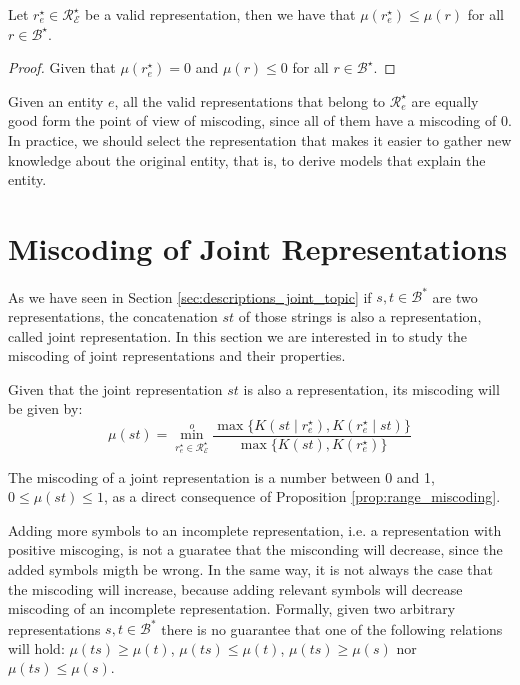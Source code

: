 \begin{proposition}
Let $r^\star_e \in \mathcal{R}^\star_\mathcal{E}$ be a valid representation, then we have that $\mu\left( r^\star_e \right) \leq \mu\left( r \right)$ for all $r \in \mathcal{B}^\star$.
\end{proposition}
\begin{proof}
Given that $\mu\left( r^\star_e \right) = 0$ and $\mu\left( r \right) \leq 0$ for all $r \in \mathcal{B}^\star$.
\end{proof}

Given an entity $e$, all the valid representations that belong to $\mathcal{R}^\star_e$ are equally good form the point of view of miscoding, since all of them have a miscoding of $0$. In practice, we should select the representation that makes it easier to gather new knowledge about the original entity, that is, to derive models that explain the entity.

%
%

\section{Miscoding of Joint Representations}
\label{sec:joint_miscoding}

As we have seen in Section \ref{sec:descriptions_joint_topic} if $s, t \in \mathcal{B}^\ast$ are two representations, the concatenation $st$ of those strings is also a representation, called joint representation. In this section we are interested in to study the miscoding of joint representations and their properties.

Given that the joint representation $st$ is also a representation, its miscoding will be given by:
\[
\mu(st) = \overset{o}{ \underset{ r^\star_e \in \mathcal{R}^\star_\mathcal{E} } \min} \frac{ \max\{ K \left( st \mid r^\star_e \right), K \left( r^\star_e \mid st \right) \} } { \max\{ K \left( st \right), K \left( r^\star_e \right) \} }
\]

The miscoding of a joint representation is a number between 0 and 1, $0 \leq \mu(st) \leq 1$, as a direct consequence of Proposition \ref{prop:range_miscoding}.

Adding more symbols to an incomplete representation, i.e. a representation with positive miscoging, is not a guaratee that the misconding will decrease, since the added symbols migth be wrong. In the same way, it is not always the case that the miscoding will increase, because adding relevant symbols will decrease miscoding of an incomplete representation. Formally, given two arbitrary representations $s, t \in \mathcal{B}^\ast$ there is no guarantee that one of the following relations will hold: $\mu(ts) \geq \mu(t)$, $\mu(ts) \leq \mu(t)$, $\mu(ts) \geq \mu(s)$ nor $\mu(ts) \leq \mu(s)$.

